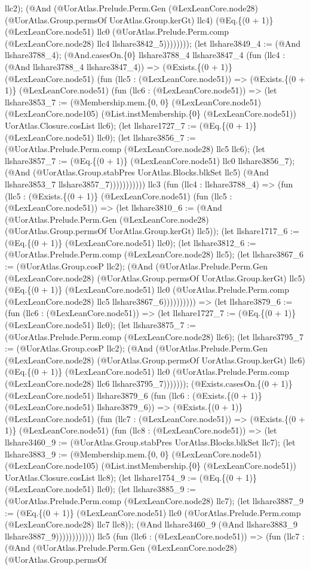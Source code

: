 \documentclass[11pt]{article}
\begin{document}
llc2); (@And (@UorAtlas.Prelude.Perm.Gen (@LexLeanCore.node28) (@UorAtlas.Group.permsOf UorAtlas.Group.kerGt) llc4) (@Eq.\{(0 + 1)\} (@LexLeanCore.node51) llc0 (@UorAtlas.Prelude.Perm.comp (@LexLeanCore.node28) llc4 llshare3842\_5)))))))); (let llshare3849\_4 := (@And llshare3788\_4); (@And.casesOn.\{0\} llshare3788\_4 llshare3847\_4 (fun (llc4 : (@And llshare3788\_4 llshare3847\_4)) => (@Exists.\{(0 + 1)\} (@LexLeanCore.node51) (fun (llc5 : (@LexLeanCore.node51)) => (@Exists.\{(0 + 1)\} (@LexLeanCore.node51) (fun (llc6 : (@LexLeanCore.node51)) => (let llshare3853\_7 := (@Membership.mem.\{0, 0\} (@LexLeanCore.node51) (@LexLeanCore.node105) (@List.instMembership.\{0\} (@LexLeanCore.node51)) UorAtlas.Closure.cosList llc6); (let llshare1727\_7 := (@Eq.\{(0 + 1)\} (@LexLeanCore.node51) llc0); (let llshare3856\_7 := (@UorAtlas.Prelude.Perm.comp (@LexLeanCore.node28) llc5 llc6); (let llshare3857\_7 := (@Eq.\{(0 + 1)\} (@LexLeanCore.node51) llc0 llshare3856\_7); (@And (@UorAtlas.Group.stabPres UorAtlas.Blocks.blkSet llc5) (@And llshare3853\_7 llshare3857\_7))))))))))) llc3 (fun (llc4 : llshare3788\_4) => (fun (llc5 : (@Exists.\{(0 + 1)\} (@LexLeanCore.node51) (fun (llc5 : (@LexLeanCore.node51)) => (let llshare3810\_6 := (@And (@UorAtlas.Prelude.Perm.Gen (@LexLeanCore.node28) (@UorAtlas.Group.permsOf UorAtlas.Group.kerGt) llc5)); (let llshare1717\_6 := (@Eq.\{(0 + 1)\} (@LexLeanCore.node51) llc0); (let llshare3812\_6 := (@UorAtlas.Prelude.Perm.comp (@LexLeanCore.node28) llc5); (let llshare3867\_6 := (@UorAtlas.Group.cosP llc2); (@And (@UorAtlas.Prelude.Perm.Gen (@LexLeanCore.node28) (@UorAtlas.Group.permsOf UorAtlas.Group.kerGt) llc5) (@Eq.\{(0 + 1)\} (@LexLeanCore.node51) llc0 (@UorAtlas.Prelude.Perm.comp (@LexLeanCore.node28) llc5 llshare3867\_6)))))))))) => (let llshare3879\_6 := (fun (llc6 : (@LexLeanCore.node51)) => (let llshare1727\_7 := (@Eq.\{(0 + 1)\} (@LexLeanCore.node51) llc0); (let llshare3875\_7 := (@UorAtlas.Prelude.Perm.comp (@LexLeanCore.node28) llc6); (let llshare3795\_7 := (@UorAtlas.Group.cosP llc2); (@And (@UorAtlas.Prelude.Perm.Gen (@LexLeanCore.node28) (@UorAtlas.Group.permsOf UorAtlas.Group.kerGt) llc6) (@Eq.\{(0 + 1)\} (@LexLeanCore.node51) llc0 (@UorAtlas.Prelude.Perm.comp (@LexLeanCore.node28) llc6 llshare3795\_7))))))); (@Exists.casesOn.\{(0 + 1)\} (@LexLeanCore.node51) llshare3879\_6 (fun (llc6 : (@Exists.\{(0 + 1)\} (@LexLeanCore.node51) llshare3879\_6)) => (@Exists.\{(0 + 1)\} (@LexLeanCore.node51) (fun (llc7 : (@LexLeanCore.node51)) => (@Exists.\{(0 + 1)\} (@LexLeanCore.node51) (fun (llc8 : (@LexLeanCore.node51)) => (let llshare3460\_9 := (@UorAtlas.Group.stabPres UorAtlas.Blocks.blkSet llc7); (let llshare3883\_9 := (@Membership.mem.\{0, 0\} (@LexLeanCore.node51) (@LexLeanCore.node105) (@List.instMembership.\{0\} (@LexLeanCore.node51)) UorAtlas.Closure.cosList llc8); (let llshare1754\_9 := (@Eq.\{(0 + 1)\} (@LexLeanCore.node51) llc0); (let llshare3885\_9 := (@UorAtlas.Prelude.Perm.comp (@LexLeanCore.node28) llc7); (let llshare3887\_9 := (@Eq.\{(0 + 1)\} (@LexLeanCore.node51) llc0 (@UorAtlas.Prelude.Perm.comp (@LexLeanCore.node28) llc7 llc8)); (@And llshare3460\_9 (@And llshare3883\_9 llshare3887\_9)))))))))))) llc5 (fun (llc6 : (@LexLeanCore.node51)) => (fun (llc7 : (@And (@UorAtlas.Prelude.Perm.Gen (@LexLeanCore.node28) (@UorAtlas.Group.permsOf 
\end{document}
